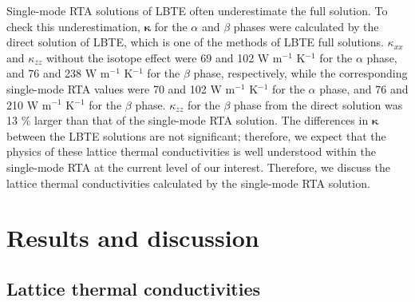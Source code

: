 \documentclass[twocolumn,amsmath,amssymb,a4paper,prb,superscriptaddress,floatfix]{revtex4-1}
\begin{document}
Single-mode RTA solutions of LBTE often underestimate the full
solution.\cite{mukhopadhyay-ltc,ward-ltc} To check this underestimation,
$\boldsymbol{\kappa}$ for the $\alpha$ and $\beta$ phases were calculated by the
direct solution of LBTE\cite{chaput-direct}, which is one of the methods of LBTE
full solutions. $\kappa_{xx}$ and $\kappa_{zz}$ without the isotope effect were
69 and 102 W m$^{-1}$ K$^{-1}$ for the $\alpha$ phase, and 76 and 238
W m$^{-1}$ K$^{-1}$ for the $\beta$ phase, respectively, while the corresponding
single-mode RTA values were 70 and 102 W m$^{-1}$ K$^{-1}$ for the $\alpha$ phase,
and 76 and 210 W m$^{-1}$ K$^{-1}$ for the $\beta$ phase. $\kappa_{zz}$ for the
$\beta$ phase from the direct solution was 13 \% larger than that of the
single-mode RTA solution. The differences in $\boldsymbol{\kappa}$ between the
LBTE solutions are not significant; therefore, we expect that the physics of
these lattice thermal conductivities is well understood within the
single-mode RTA at the current level of our interest. Therefore, we discuss the
lattice thermal conductivities calculated by the single-mode RTA solution.

\section{Results and discussion}

\subsection{Lattice thermal conductivities}
\end{document}
